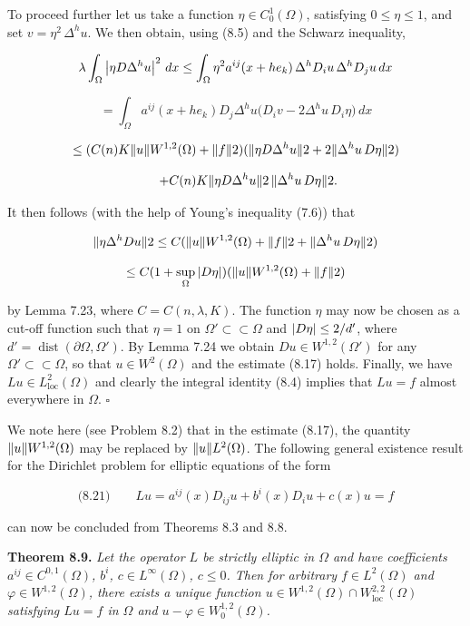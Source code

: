 \noindent To proceed further let us take a function $\eta \in C_0^1(\Omega)$, satisfying $0 \le \eta \le 1$, and set
$v=\eta^2\, \Delta^h u$. We then obtain, using (8.5) and the Schwarz inequality,

\[
\lambda \int_{\Omega} \left|\eta D \Delta^h u\right|^2\, dx \le \int_{\Omega} \eta^2 a^{ij}(x+h e_k)\, \Delta^h D_i u\, \Delta^h D_j u\, dx
\]

\[
= \int_{\Omega} a^{ij}(x+h e_k) D_j \Delta^h u \bigl(D_i v - 2 \Delta^h u\, D_i \eta\bigr)\, dx
\]

\[
\le (C(n)K\lVert u\rVert{W^{1,2}(\Omega)}+\lVert f\rVert{2})(\lVert \eta D \Delta^h u\rVert{2}+2\lVert \Delta^h u\, D\eta\rVert{2})
\]

\[
\qquad + C(n)K\lVert \eta D \Delta^h u\rVert{2}\, \lVert \Delta^h u\, D\eta\rVert{2}.
\]

\noindent It then follows (with the help of Young's inequality (7.6)) that

\[
\lVert \eta \Delta^h Du\rVert{2} \le C(\lVert u\rVert{W^{1,2}(\Omega)}+\lVert f\rVert{2}+\lVert \Delta^h u\, D\eta\rVert{2})
\]

\[
\le C(1+\sup_{\Omega}\left|D\eta\right|)(\lVert u\rVert{W^{1,2}(\Omega)}+\lVert f\rVert{2})
\]

\noindent by Lemma 7.23, where $C=C(n,\lambda,K)$. The function $\eta$ may now be chosen as a
cut-off function such that $\eta=1$ on $\Omega' \subset \subset \Omega$ and $\left|D\eta\right|\le 2/d'$, where $d'=\operatorname{dist}(\partial\Omega,\Omega')$. By Lemma 7.24 we obtain $Du \in W^{1,2}(\Omega')$ for any $\Omega' \subset \subset \Omega$, so that
$u \in W^{2}(\Omega)$ and the estimate (8.17) holds. Finally, we have $Lu \in L^2_{\operatorname{loc}}(\Omega)$ and clearly
the integral identity (8.4) implies that $Lu=f$ almost everywhere in $\Omega$. \hfill $\square$

\bigskip

\noindent We note here (see Problem 8.2) that in the estimate (8.17), the quantity
$\lVert u\rVert{W^{1,2}(\Omega)}$ may be replaced by $\lVert u\rVert{L^2(\Omega)}$.
The following general existence result for the Dirichlet problem for elliptic
equations of the form

\[
\text{(8.21)} \qquad Lu = a^{ij}(x)D_{ij}u + b^i(x)D_i u + c(x)u = f
\]

\noindent can now be concluded from Theorems 8.3 and 8.8.

\bigskip

\noindent\textbf{Theorem 8.9.} \textit{Let the operator $L$ be strictly elliptic in $\Omega$ and have coefficients
$a^{ij} \in C^{0,1}(\Omega)$, $b^i$, $c \in L^\infty(\Omega)$, $c \le 0$. Then for arbitrary $f \in L^2(\Omega)$ and $\varphi \in W^{1,2}(\Omega)$,
there exists a unique function $u \in W^{1,2}(\Omega) \cap W^{2,2}_{\operatorname{loc}}(\Omega)$ satisfying $Lu=f$ in $\Omega$ and
$u-\varphi \in W^{1,2}_0(\Omega)$.}

